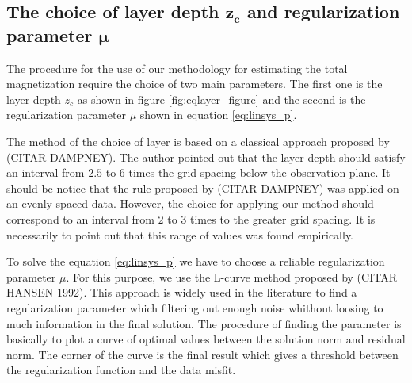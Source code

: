 %
%


\subsection{The choice of layer depth $\mathbf{z_c}$ and regularization parameter $\mathbf{\mu}$}

The procedure for the use of our methodology for estimating the total magnetization require the choice of two main parameters. The first one is the layer depth $z_c$ as shown in figure \ref{fig:eqlayer_figure} and the second is the regularization parameter $\mu$ shown in equation \ref{eq:linsys_p}.

The method of the choice of layer is based on a classical approach proposed by (CITAR DAMPNEY). The author pointed out that the layer depth should satisfy an interval from $2.5$ to $6$ times the grid spacing below the observation plane. It should be notice that the rule proposed by (CITAR DAMPNEY) was applied on an evenly spaced data. However, the choice for applying our method should correspond to an interval from $2$ to $3$ times to the greater grid spacing. It is necessarily to point out that this range of values was found empirically.

To solve the equation \ref{eq:linsys_p} we have to choose a reliable regularization parameter $\mu$. For this purpose, we use the L-curve method proposed by (CITAR HANSEN 1992). This approach is widely used in the literature to find a regularization parameter which filtering out enough noise whithout loosing to much information in the final solution. The procedure of finding the parameter is basically to plot a curve of optimal values between the solution norm and residual norm. The corner of the curve is the final result which gives a threshold between the regularization function and the data misfit.

